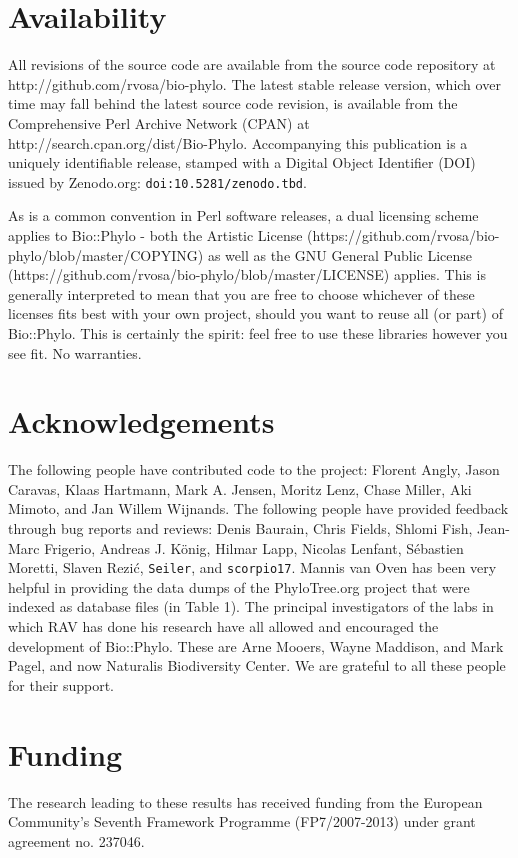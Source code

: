 \documentclass{bioinfo}
\begin{document}
\section{Availability}

All revisions of the source code are available from the source code repository at
http://github.com/rvosa/bio-phylo. The latest stable release version, which over time may
fall behind the latest source code revision, is available from the Comprehensive Perl 
Archive Network (CPAN) at http://search.cpan.org/dist/Bio-Phylo. Accompanying this 
publication is a uniquely identifiable release, stamped with a Digital Object Identifier 
(DOI) issued by Zenodo.org: \texttt{doi:10.5281/zenodo.tbd}.

As is a common convention in Perl software releases, a dual licensing scheme applies to
Bio::Phylo - both the Artistic License 
(https://github.com/rvosa/bio-phylo/blob/master/COPYING) as well as the GNU General Public 
License (https://github.com/rvosa/bio-phylo/blob/master/LICENSE) applies. This is 
generally interpreted to mean that you are free to choose whichever of these licenses fits 
best with your own project, should you want to reuse all (or part) of Bio::Phylo. This is 
certainly the spirit: feel free to use these libraries however you see fit. No warranties.

\section*{Acknowledgements}

The following people have contributed code to the project: Florent Angly, Jason Caravas, 
Klaas Hartmann, Mark A. Jensen, Moritz Lenz, Chase Miller, Aki Mimoto, and Jan Willem 
Wijnands. The following people have provided feedback through bug reports and reviews:
Denis Baurain, Chris Fields, Shlomi Fish, Jean-Marc Frigerio, Andreas J. K\"{o}nig, Hilmar 
Lapp, Nicolas Lenfant, S\'{e}bastien Moretti, Slaven Rezi\'{c}, \texttt{Seiler}, and
\texttt{scorpio17}. Mannis van Oven has been very helpful in providing the data dumps of
the PhyloTree.org project that were indexed as database files (in Table 1). The principal
investigators of the labs in which RAV has done his research have all allowed and 
encouraged the development of Bio::Phylo. These are Arne Mooers, Wayne Maddison, and Mark
Pagel, and now Naturalis Biodiversity Center. We are grateful to all these people for 
their support.

\section*{Funding}

The research leading to these results has received funding from the European Community's 
Seventh Framework Programme (FP7/2007-2013) under grant agreement no. 237046.




\end{document}
